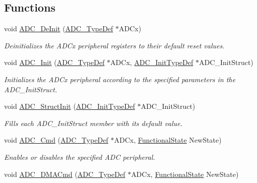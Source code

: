 \subsection*{Functions}
\begin{DoxyCompactItemize}
\item 
void \hyperlink{group___a_d_c___private___functions_ga31fa6bc09de17125e9db2830ce77c09b}{A\+D\+C\+\_\+\+De\+Init} (\hyperlink{struct_a_d_c___type_def}{A\+D\+C\+\_\+\+Type\+Def} $\ast$A\+D\+Cx)
\begin{DoxyCompactList}\small\item\em Deinitializes the A\+D\+Cx peripheral registers to their default reset values. \end{DoxyCompactList}\item 
void \hyperlink{group___a_d_c___private___functions_gabbab6038cf8691404350625e477254f9}{A\+D\+C\+\_\+\+Init} (\hyperlink{struct_a_d_c___type_def}{A\+D\+C\+\_\+\+Type\+Def} $\ast$A\+D\+Cx, \hyperlink{struct_a_d_c___init_type_def}{A\+D\+C\+\_\+\+Init\+Type\+Def} $\ast$A\+D\+C\+\_\+\+Init\+Struct)
\begin{DoxyCompactList}\small\item\em Initializes the A\+D\+Cx peripheral according to the specified parameters in the A\+D\+C\+\_\+\+Init\+Struct. \end{DoxyCompactList}\item 
void \hyperlink{group___a_d_c___private___functions_ga6c6e754d1d0a98d56e465efaf73272ec}{A\+D\+C\+\_\+\+Struct\+Init} (\hyperlink{struct_a_d_c___init_type_def}{A\+D\+C\+\_\+\+Init\+Type\+Def} $\ast$A\+D\+C\+\_\+\+Init\+Struct)
\begin{DoxyCompactList}\small\item\em Fills each A\+D\+C\+\_\+\+Init\+Struct member with its default value. \end{DoxyCompactList}\item 
void \hyperlink{group___a_d_c___private___functions_ga40882d399e3371755ed610c1134e634e}{A\+D\+C\+\_\+\+Cmd} (\hyperlink{struct_a_d_c___type_def}{A\+D\+C\+\_\+\+Type\+Def} $\ast$A\+D\+Cx, \hyperlink{group___exported__types_gac9a7e9a35d2513ec15c3b537aaa4fba1}{Functional\+State} New\+State)
\begin{DoxyCompactList}\small\item\em Enables or disables the specified A\+DC peripheral. \end{DoxyCompactList}\item 
void \hyperlink{group___a_d_c___private___functions_gac5881d5995818001584b27b137a8dbcb}{A\+D\+C\+\_\+\+D\+M\+A\+Cmd} (\hyperlink{struct_a_d_c___type_def}{A\+D\+C\+\_\+\+Type\+Def} $\ast$A\+D\+Cx, \hyperlink{group___exported__types_gac9a7e9a35d2513ec15c3b537aaa4fba1}{Functional\+State} New\+State)

\end{DoxyCompactItemize}
